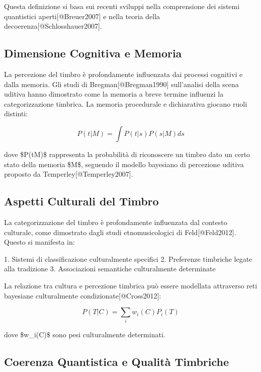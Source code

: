 \documentclass[a4paper,11pt]{article}
\begin{document}
Questa definizione si basa sui recenti sviluppi nella comprensione dei
sistemi quantistici aperti{[}@Breuer2007{]} e nella teoria della
decoerenza{[}@Schlosshauer2007{]}.

\subsection{Dimensione Cognitiva e Memoria}\hypertarget{dimensione-cognitiva-e-memoria}{}\label{dimensione-cognitiva-e-memoria}

La percezione del timbro è profondamente influenzata dai processi
cognitivi e dalla memoria. Gli studi di Bregman{[}@Bregman1990{]}
sull'analisi della scena uditiva hanno dimostrato come la memoria a
breve termine influenzi la categorizzazione timbrica. La memoria
procedurale e dichiarativa giocano ruoli distinti:

\begin{displaymath}
P(t|M) = \int P(t|s)P(s|M)ds
\end{displaymath}

dove \$P(t\textbar{}M)\$ rappresenta la probabilità di riconoscere un timbro dato
un certo stato della memoria \$M\$, seguendo il modello bayesiano di
percezione uditiva proposto da Temperley{[}@Temperley2007{]}.

\subsection{Aspetti Culturali del Timbro}\hypertarget{aspetti-culturali-del-timbro}{}\label{aspetti-culturali-del-timbro}

La categorizzazione del timbro è profondamente influenzata dal contesto
culturale, come dimostrato dagli studi etnomusicologici di
Feld{[}@Feld2012{]}. Questo si manifesta in:

1. Sistemi di classificazione culturalmente specifici 2. Preferenze
timbriche legate alla tradizione 3. Associazioni semantiche
culturalmente determinate

La relazione tra cultura e percezione timbrica può essere modellata
attraverso reti bayesiane culturalmente condizionate{[}@Cross2012{]}:

\begin{displaymath}
P(T|C) = \sum_i w_i(C)P_i(T)
\end{displaymath}

dove \$w\_i(C)\$ sono pesi culturalmente determinati.

\subsection{Coerenza Quantistica e Qualità Timbriche}\hypertarget{coerenza-quantistica-e-qualit-timbriche}{}\label{coerenza-quantistica-e-qualit-timbriche}
\end{document}
